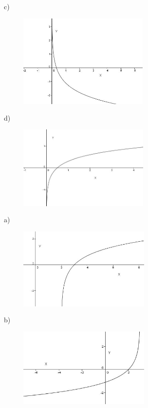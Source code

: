 \begin{respostas}{7}
c)
\begin{figure}[H]
	\begin{Center}
		\includegraphics[width=2.55in,height=1.84in]{capitulos/logaritmos_e_funcao_logaritmica/media/image28.JPG}
	\end{Center}
\end{figure}

d)
\begin{figure}[H]
	\begin{Center}
		\includegraphics[width=2.56in,height=1.64in]{capitulos/logaritmos_e_funcao_logaritmica/media/image29.JPG}
	\end{Center}
\end{figure}

    \ansitem{}


a)\begin{figure}[H]
	\begin{Center}
		\includegraphics[width=2.58in,height=1.6in]{capitulos/logaritmos_e_funcao_logaritmica/media/image30.JPG}
	\end{Center}
\end{figure}

b)\begin{figure}[H]
	\begin{Center}
		\includegraphics[width=2.58in,height=1.55in]{capitulos/logaritmos_e_funcao_logaritmica/media/image31.JPG}
	\end{Center}
\end{figure}


\end{respostas}
